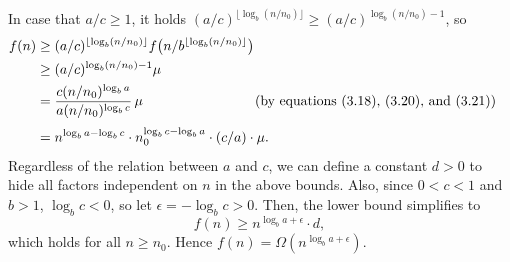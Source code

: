 In case that $a/c\ge1$, it holds $(a/c)^{\lfloor\log_b(n/n_0)\rfloor}\ge(a/c)^{\log_b(n/n_0)-1}$, so
\begin{align*}
    f(n) &\ge (a/c)^{\lfloor\log_b(n/n_0)\rfloor}f\bigl(n/b^{\lfloor\log_b(n/n_0)\rfloor}\bigr) \\
    &\ge (a/c)^{\log_b(n/n_0)-1}\mu \\
	&= \frac{c(n/n_0)^{\log_ba}}{a(n/n_0)^{\log_bc}}\,\mu && \hspace{-2em}\text{(by equations (3.18), (3.20), and (3.21))} \\[1mm]
	&= n^{\log_ba-\log_bc}\cdot n_0^{\log_bc-\log_ba}\cdot(c/a)\cdot\mu.
\end{align*}
Regardless of the relation between $a$ and $c$, we can define a constant $d>0$ to hide all factors independent on $n$ in the above bounds.
Also, since $0<c<1$ and $b>1$, $\log_bc<0$, so let $\epsilon=-\log_bc>0$.
Then, the lower bound simplifies to
\[
    f(n) \ge n^{\log_ba+\epsilon}\cdot d,
\]
which holds for all $n\ge n_0$.
Hence $f(n)=\Omega(n^{\log_ba+\epsilon})$.
